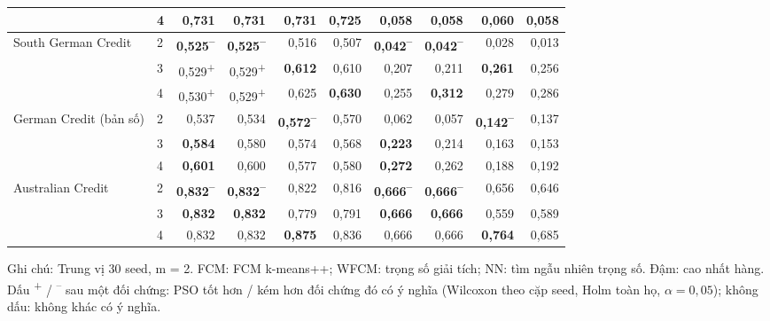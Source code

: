 \begin{table}[htbp]
\begin{tabular}{@{}llrrrrrrrr@{}}
 & 4 & \textbf{0,731} & \textbf{0,731} & \textbf{0,731} & 0,725 & 0,058 & 0,058 & \textbf{0,060} & 0,058 \\
\midrule
South German Credit & 2 & \textbf{0,525\textsuperscript{--}} & \textbf{0,525\textsuperscript{--}} & 0,516 & 0,507 & \textbf{0,042\textsuperscript{--}} & \textbf{0,042\textsuperscript{--}} & 0,028 & 0,013 \\
 & 3 & 0,529\textsuperscript{+} & 0,529\textsuperscript{+} & \textbf{0,612} & 0,610 & 0,207 & 0,211 & \textbf{0,261} & 0,256 \\
 & 4 & 0,530\textsuperscript{+} & 0,529\textsuperscript{+} & 0,625 & \textbf{0,630} & 0,255 & \textbf{0,312} & 0,279 & 0,286 \\
\midrule
German Credit (bản số) & 2 & 0,537 & 0,534 & \textbf{0,572\textsuperscript{--}} & 0,570 & 0,062 & 0,057 & \textbf{0,142\textsuperscript{--}} & 0,137 \\
 & 3 & \textbf{0,584} & 0,580 & 0,574 & 0,568 & \textbf{0,223} & 0,214 & 0,163 & 0,153 \\
 & 4 & \textbf{0,601} & 0,600 & 0,577 & 0,580 & \textbf{0,272} & 0,262 & 0,188 & 0,192 \\
\midrule
Australian Credit & 2 & \textbf{0,832\textsuperscript{--}} & \textbf{0,832\textsuperscript{--}} & 0,822 & 0,816 & \textbf{0,666\textsuperscript{--}} & \textbf{0,666\textsuperscript{--}} & 0,656 & 0,646 \\
 & 3 & \textbf{0,832} & \textbf{0,832} & 0,779 & 0,791 & \textbf{0,666} & \textbf{0,666} & 0,559 & 0,589 \\
 & 4 & 0,832 & 0,832 & \textbf{0,875} & 0,836 & 0,666 & 0,666 & \textbf{0,764} & 0,685 \\
\bottomrule
\end{tabular}
\par\smallskip\parbox{\linewidth}{\scriptsize Ghi chú: Trung vị 30 seed, m = 2. FCM: FCM k-means++; WFCM: trọng số giải tích; NN: tìm ngẫu nhiên trọng số. Đậm: cao nhất hàng. Dấu \textsuperscript{+} / \textsuperscript{--} sau một đối chứng: PSO tốt hơn / kém hơn đối chứng đó có ý nghĩa (Wilcoxon theo cặp seed, Holm toàn họ, $\alpha = 0{,}05$); không dấu: không khác có ý nghĩa.}
\end{table}
